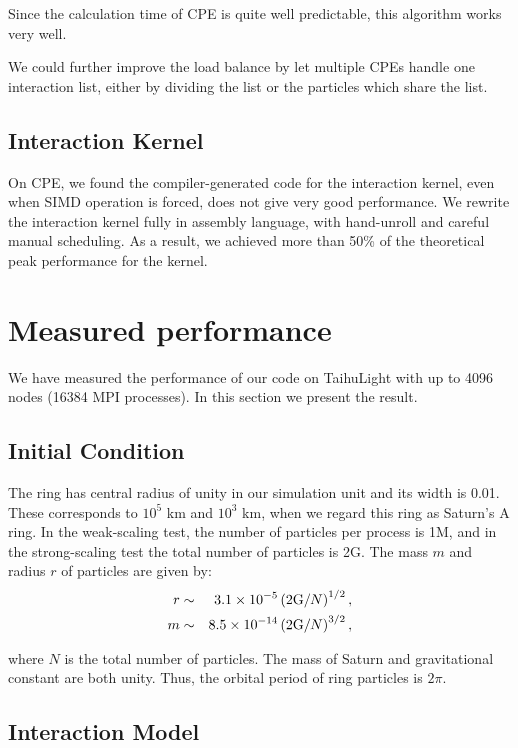 \documentclass[oribibl]{llncs}
\begin{document}
Since the calculation time of CPE is quite well predictable, this
algorithm works very well.

We could further improve the load balance by let multiple CPEs handle
one interaction list, either by dividing the list or the particles
which share the list.

\subsection{Interaction Kernel}

On CPE, we found the compiler-generated code for the interaction
kernel, even when SIMD operation is forced, does not give very good
performance. We rewrite the interaction kernel fully in assembly
language, with hand-unroll and careful manual scheduling. As a result,
we achieved more than 50\% of the theoretical peak performance for the
kernel.

\section{Measured performance}
\label{sec:result}

We have measured the performance of our code on TaihuLight with up to
4096 nodes (16384 MPI processes). In this section we present the
result.

\subsection{Initial Condition}

The ring has central radius of unity in our simulation unit and its
width is 0.01. These corresponds to $10^5$ km and $10^3$ km, when we
regard this ring as Saturn's A ring.  In the weak-scaling test, the
number of particles per process is 1M, and in the strong-scaling test
the total number of particles is 2G. The mass $m$ and radius $r$ of
particles are given by:
\begin{eqnarray}
  r &\sim& 3.1 \times 10^{-5} \left( 2 {\rm G} / N \right) ^{1/2}, \\ 
  m &\sim& 8.5 \times 10^{-14} \left( 2 {\rm G} / N \right) ^{3/2}, 
\end{eqnarray}

where $N$ is the total number of particles. The mass of Saturn and
gravitational constant are both unity. Thus, the orbital period of
ring particles is $2\pi$.

\subsection{Interaction Model}
\end{document}
